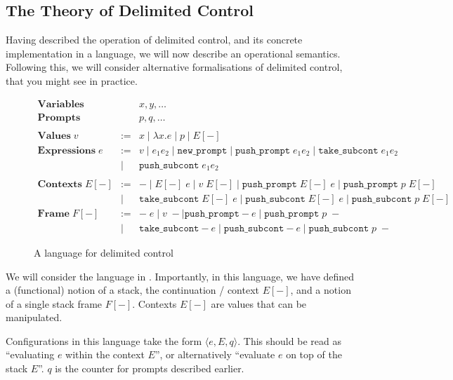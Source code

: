 \subsection{The Theory of Delimited Control}\label{section:delimited-control-theory}
Having described the operation of delimited control, and its concrete implementation in a language, we will now describe an operational semantics. Following this, we will consider alternative formalisations of delimited control, that you might see in practice. 

\begin{figure}[H]
    \centering
    $\begin{array}{lrl}
        \textbf{Variables} & & x, y, \ldots \\
        \textbf{Prompts}   & & p, q, \ldots \\
        \\
        \textbf{Values} \; v & := & x \mid \lambda x.e \mid p \mid E[-] \\
        \textbf{Expressions} \; e & := &v \mid e_1 e_2 \mid \texttt{new\_prompt} \mid \texttt{push\_prompt} \; e_1 e_2 \mid \texttt{take\_subcont} \; e_1 e_2 \\
        &\mid & \texttt{push\_subcont}\; e_1 e_2 \\
        \\
        \textbf{Contexts}\; E[-] & := & - \mid E[-] \; e \mid v \; E[-] \mid \texttt{push\_prompt} \; E[-] \; e \mid \texttt{push\_prompt} \; p \; E[-] \\
        &\mid&\texttt{take\_subcont}\; E[-]\; e \mid \texttt{push\_subcont} \; E[-] \; e \mid \texttt{push\_subcont} \; p \; E[-]\\
        \textbf{Frame} \; F[-] & := & - \; e \mid v \; - \mid \texttt{push\_prompt} - e \mid \texttt{push\_prompt} \; p \; - \\
        &\mid&\texttt{take\_subcont} - e \mid \texttt{push\_subcont} - e \mid \texttt{push\_subcont} \; p \; -
    \end{array}$
    \caption{A language for delimited control}
    \label{fig:language-delimited-control}
\end{figure}

We will consider the language in . Importantly, in this language, we have defined a (functional) notion of a stack, the continuation / context $E[-]$, and a notion of a single stack frame $F[-]$. Contexts $E[-]$ are values that can be manipulated. 

Configurations in this language take the form $\langle e, E, q \rangle$. This should be read as ``evaluating $e$ within the context $E$'', or alternatively ``evaluate $e$ on top of the stack $E$''. $q$ is the counter for prompts described earlier.

